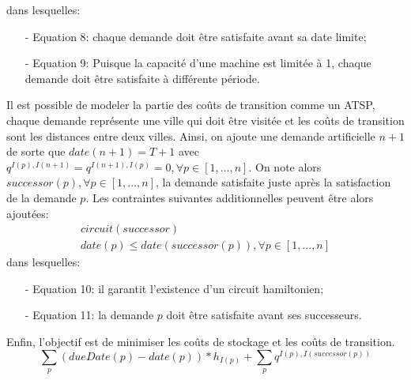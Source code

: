 		dans lesquelles:
		\begin{itemize}
			\item[-] Equation 8: chaque demande doit être satisfaite avant sa date limite;
			\item[-] Equation 9: Puisque la capacité d'une machine est limitée à 1, chaque demande doit être satisfaite à différente période.
		\end{itemize}
		Il est possible de modeler la partie des coûts de transition comme un ATSP, chaque demande représente une ville qui doit être visitée et les coûts de transition sont les distances entre deux villes. Ainsi, on ajoute une demande artificielle $n+1$ de sorte que $date(n+1) = T+1$ avec $q^{I(p), I(n+1)} = q^{I(n+1), I(p)} = 0, \forall p \in [1,...,n]$. On note alors $successor(p), \forall p \in [1,...,n]$, la demande satisfaite juste après la satisfaction de la demande $p$. Les contraintes suivantes additionnelles peuvent être alors ajoutées:
		\begin{eqnarray}
			circuit(successor) \\
			date(p) \leq date(successor(p)), \forall p \in [1,...,n]
		\end{eqnarray}
		dans lesquelles:
		\begin{itemize}
			\item[-] Equation 10: il garantit l'existence d'un circuit hamiltonien;
			\item[-] Equation 11: la demande $p$ doit être satisfaite avant ses successeurs.
		\end{itemize}
		
		Enfin, l'objectif est de minimiser les coûts de stockage et les coûts de transition.
		\[
			\sum_{p}{(dueDate(p)-date(p))} * h_{I(p)} + \sum_{p}{q^{I(p),I(successor(p))}}
		\]
		
	
